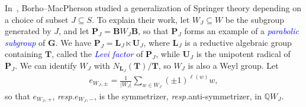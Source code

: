 \documentclass[submission]{FPSAC2025}
\newcommand{\dfemph}[1]{\textcolor{blue}{\emph{#1}}}
\begin{document}

In~\cite{bm}, Borho--MacPherson studied a generalization of Springer theory depending on a choice of subset $J \subseteq S$.
To explain their work, let $W_J \subseteq W$ be the subgroup generated by $J$, and let $\mathbf{P}_J = \mathbf{B}W_J\mathbf{B}$, so that $\mathbf{P}_J$ forms an example of a \dfemph{parabolic subgroup} of $\mathbf{G}$.
We have $\mathbf{P}_J = \mathbf{L}_J \ltimes \mathbf{U}_J$, where $\mathbf{L}_J$ is a reductive algebraic group containing $\mathbf{T}$, called the \dfemph{Levi factor} of $\mathbf{P}_J$, while $\mathbf{U}_J$ is the unipotent radical of $\mathbf{P}_J$.
We can identify $W_J$ with $N_{\mathbf{L}_J}(\mathbf{T})/\mathbf{T}$, so $W_J$ is also a Weyl group.
Let
\begin{align}
e_{W_J, \pm} = \frac{1}{|W_J|} \sum_{w \in W_J} {(\pm 1)^{\ell(w)}} w,
\end{align}
so that $e_{W_J, +}$, \emph{resp.}\@ $e_{W_J, -}$, is the symmetrizer, \emph{resp.}\@ anti-symmetrizer, in $\mathbb{Q}W_J$.
\end{document}
